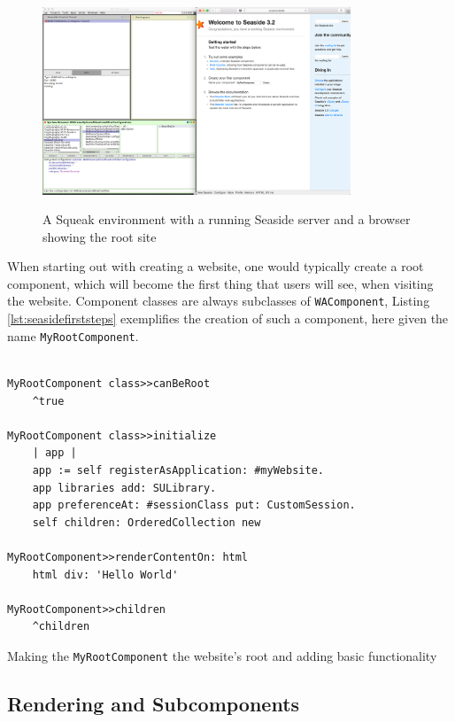 \documentclass[a4paper,12pt,pagesize,headsepline,oribibl,titlepage]{scrartcl}
\begin{document}
\begin{figure}[h]
\begin{center}
\includegraphics*[width=0.82\textwidth]{images/started.png}\\
\caption{A Squeak environment with a running Seaside server and a browser showing the root site}
\label{abb:start}
\end{center}
\end{figure}

When starting out with creating a website, one would typically create a root component, which will become the first thing that users will see, when visiting the website. Component classes are always subclasses of \texttt{WAComponent}, Listing \ref{lst:seasidefirststeps} exemplifies the creation of such a component, here given the name \texttt{MyRootComponent}. 

\begin{listing}[]%
\begin{verbatim}

MyRootComponent class>>canBeRoot
    ^true
    
MyRootComponent class>>initialize
    | app |
    app := self registerAsApplication: #myWebsite.
    app libraries add: SULibrary.
    app preferenceAt: #sessionClass put: CustomSession.
    self children: OrderedCollection new
    
MyRootComponent>>renderContentOn: html
    html div: 'Hello World'
    
MyRootComponent>>children
    ^children

\end{verbatim}
\caption{Making the \texttt{MyRootComponent} the website's root and adding basic functionality}
\label{lst:seasidefirststeps}
\end{listing}

\subsection{Rendering and Subcomponents}
\end{document}
